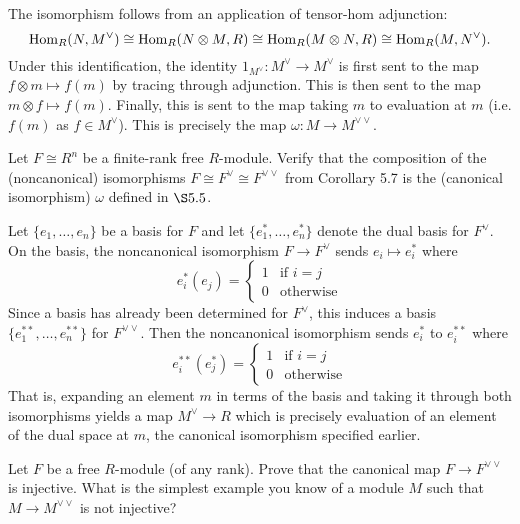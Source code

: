 \documentclass[../../master.tex]{subfiles}
\begin{document}
\begin{solution}
    The isomorphism follows from an application of tensor-hom adjunction:
    \[
    \operatorname{Hom}_R(N, M^{\vee}) \cong \operatorname{Hom}_R(N \otimes M, R) \cong \operatorname{Hom}_R(M \otimes N, R) \cong \operatorname{Hom}_R(M, N^{\vee}).
    \]
    Under this identification, the identity $1_{M^{\vee}}: M^{\vee} \to M^{\vee}$ is first sent to the map $f \otimes m \mapsto f(m)$ by tracing through adjunction.
    This is then sent to the map $m \otimes f \mapsto f(m)$.
    Finally, this is sent to the map taking $m$ to evaluation at $m$ (i.e. $f(m)$ as $f \in M^{\vee}$).
    This is precisely the map $\omega : M \to M^{\vee \vee}$.
\end{solution}

\begin{problem}
    Let $F \cong R^{n}$ be a finite-rank free $R$-module.
    Verify that the composition of the (noncanonical) isomorphisms $F \cong F^{\vee} \cong F^{\vee \vee}$ from Corollary 5.7 is the (canonical isomorphism) $\omega$ defined in $\S 5.5$.
\end{problem}

\begin{solution}
    Let $\{e_1, \ldots, e_n\}$ be a basis for $F$ and let $\{e^{*}_1, \ldots, e^{*}_n\}$ denote the dual basis for $F^{\vee}$.
    On the basis, the noncanonical isomorphism $F \to F^{\vee}$ sends $e_i \mapsto e^{*}_i$ where
    \[
        e^{*}_i (e_j) = 
        \begin{cases}
            1 & \text{if $i = j$} \\
            0 & \text{otherwise}
        \end{cases}
    \]
    Since a basis has already been determined for $F^{\vee}$, this induces a basis $\{e^{**}_1, \ldots, e^{**}_n\}$ for $F^{\vee \vee}$.
    Then the noncanonical isomorphism sends $e^{*}_i$ to $e^{**}_i$ where
    \[
    e^{**}_i (e^{*}_j) = 
    \begin{cases}
            1 & \text{if $i = j$} \\
            0 & \text{otherwise}
    \end{cases}
    \]
    That is, expanding an element $m$ in terms of the basis and taking it through both isomorphisms yields a map $M^{\vee} \to R$ which is precisely evaluation of an element of the dual space at $m$, the canonical isomorphism specified earlier.
\end{solution}

\begin{problem}
    Let $F$ be a free $R$-module (of any rank).
    Prove that the canonical map $F \to F^{\vee \vee}$ is injective.
    What is the simplest example you know of a module $M$ such that $M \to M^{\vee \vee}$ is not injective?
\end{problem}
\end{document}
